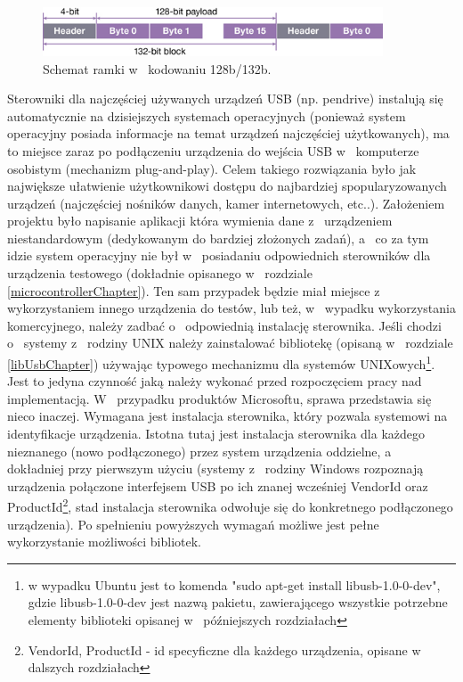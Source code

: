 \documentclass{BscUS}
\begin{document}
\begin{figure}[H]
\centering
\includegraphics[width=0.9\textwidth]{./img/128to132coding}
\caption{Schemat ramki w~ kodowaniu 128b/132b. \cite{128to132coding}}
\label{fig:128to132coding}
\end{figure}
\indent Sterowniki dla najczęściej używanych urządzeń USB (np. pendrive) instalują się automatycznie na dzisiejszych systemach operacyjnych (ponieważ system operacyjny posiada informacje na temat urządzeń najczęściej użytkowanych), ma to miejsce zaraz po podłączeniu urządzenia do wejścia USB w~ komputerze osobistym (mechanizm plug-and-play). Celem takiego rozwiązania było jak największe ułatwienie użytkownikowi dostępu do najbardziej spopularyzowanych urządzeń (najczęściej nośników danych, kamer internetowych, etc..). Założeniem projektu było napisanie aplikacji która wymienia dane z~ urządzeniem niestandardowym (dedykowanym do bardziej złożonych zadań), a~ co za tym idzie system operacyjny nie był w~ posiadaniu odpowiednich sterowników dla urządzenia testowego (dokładnie opisanego w~ rozdziale \ref{microcontrollerChapter}). Ten sam przypadek będzie miał miejsce z~ wykorzystaniem innego urządzenia do testów, lub też, w~ wypadku wykorzystania komercyjnego, należy zadbać o~ odpowiednią instalację sterownika. Jeśli chodzi o~ systemy z~ rodziny UNIX należy zainstalować bibliotekę (opisaną w~ rozdziale \ref{libUsbChapter}) używając typowego mechanizmu dla systemów UNIXowych\footnote{w wypadku Ubuntu jest to komenda "sudo apt-get install libusb-1.0-0-dev", gdzie libusb-1.0-0-dev jest nazwą pakietu, zawierającego wszystkie potrzebne elementy biblioteki opisanej w~ późniejszych rozdziałach}. Jest to jedyna czynność jaką należy wykonać przed rozpoczęciem pracy nad implementacją. W~ przypadku produktów Microsoftu, sprawa przedstawia się nieco inaczej. Wymagana jest instalacja sterownika, który pozwala systemowi na identyfikacje urządzenia. Istotna tutaj jest instalacja sterownika dla każdego nieznanego (nowo podłączonego) przez system urządzenia oddzielne, a~ dokładniej przy pierwszym użyciu (systemy z~ rodziny Windows rozpoznają urządzenia połączone interfejsem USB po ich znanej wcześniej VendorId oraz ProductId\footnote{VendorId, ProductId - id specyficzne dla każdego urządzenia, opisane w~ dalszych rozdziałach}, stad instalacja sterownika odwołuje się do konkretnego podłączonego urządzenia). Po spełnieniu powyższych wymagań możliwe jest pełne wykorzystanie możliwości bibliotek.
\end{document}
